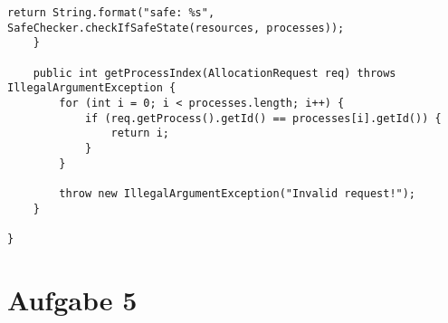 \begin{enumerate}
\begin{lstlisting}[style=java]
        return String.format("safe: %s", SafeChecker.checkIfSafeState(resources, processes));
    }

    public int getProcessIndex(AllocationRequest req) throws IllegalArgumentException {
        for (int i = 0; i < processes.length; i++) {
            if (req.getProcess().getId() == processes[i].getId()) {
                return i;
            }
        }

        throw new IllegalArgumentException("Invalid request!");
    }

}

\end{lstlisting}

\end{enumerate}

\section*{Aufgabe 5}



